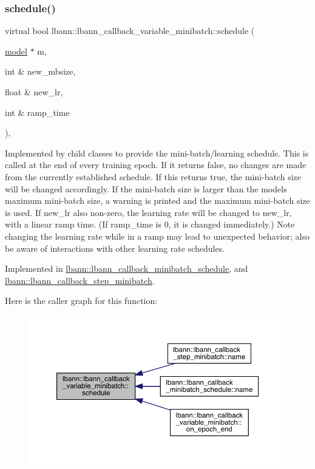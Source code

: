 \subsubsection{\texorpdfstring{schedule()}{schedule()}}
{\footnotesize\ttfamily virtual bool lbann\+::lbann\+\_\+callback\+\_\+variable\+\_\+minibatch\+::schedule (\begin{DoxyParamCaption}\item[{\hyperlink{classlbann_1_1model}{model} $\ast$}]{m,  }\item[{int \&}]{new\+\_\+mbsize,  }\item[{float \&}]{new\+\_\+lr,  }\item[{int \&}]{ramp\+\_\+time }\end{DoxyParamCaption})\hspace{0.3cm}{\ttfamily [protected]}, {}}

Implemented by child classes to provide the mini-\/batch/learning schedule. This is called at the end of every training epoch. If it returns false, no changes are made from the currently established schedule. If this returns true, the mini-\/batch size will be changed accordingly. If the mini-\/batch size is larger than the model\textquotesingle{}s maximum mini-\/batch size, a warning is printed and the maximum mini-\/batch size is used. If new\+\_\+lr also non-\/zero, the learning rate will be changed to new\+\_\+lr, with a linear ramp time. (If ramp\+\_\+time is 0, it is changed immediately.) Note changing the learning rate while in a ramp may lead to unexpected behavior; also be aware of interactions with other learning rate schedules. 

Implemented in \hyperlink{classlbann_1_1lbann__callback__minibatch__schedule_af95cbe83a587590219174cb17828ea4b}{lbann\+::lbann\+\_\+callback\+\_\+minibatch\+\_\+schedule}, and \hyperlink{classlbann_1_1lbann__callback__step__minibatch_a9ed85aa78f6e4fe4cf3427f9257a4610}{lbann\+::lbann\+\_\+callback\+\_\+step\+\_\+minibatch}.

Here is the caller graph for this function\+:\nopagebreak
\begin{figure}[H]
\begin{center}
\leavevmode
\includegraphics[width=350pt]{classlbann_1_1lbann__callback__variable__minibatch_ace13e8941491ddd28ef35c277cecb1ad_icgraph}
\end{center}
\end{figure}


